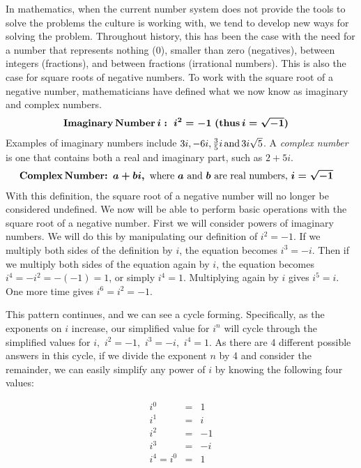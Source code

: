 In mathematics, when the current number system does not provide the tools to
solve the problems the culture is working with, we tend to develop new ways
for solving the problem. Throughout history, this has been the case with the need for a number that represents nothing (0), smaller
than zero (negatives), between integers (fractions), and between fractions
(irrational numbers). This is also the case for square roots of negative
numbers. To work with the square root of a negative number, mathematicians have
defined what we now know as imaginary and complex numbers.
\begin{eqnarray*}
  \boldsymbol{\operatorname{Imaginary} \operatorname{Number} i:~ i^2
  = - 1~ (\operatorname{thus} i = \sqrt{- 1})} &  & 
\end{eqnarray*}
Examples of imaginary numbers include $3 i, - 6 i, \frac{3}{5} i \operatorname{and} 3
i \sqrt{5}$. A \textit{complex number} is one that contains both a real
and imaginary part, such as $2 + 5 i$.
\begin{eqnarray*}
  \boldsymbol{\operatorname{Complex} \operatorname{Number:}~ a+bi, \text{~where~} a \text{~and~} b \text{~are~real~numbers,~}  i = \sqrt{- 1}} &  & 
\end{eqnarray*}
With this definition, the square root of a negative number will no longer
be considered undefined. We now will be able to perform basic operations with the square root of
a negative number. First we will consider powers of imaginary numbers. We will do
this by manipulating our definition of $i^2 = - 1$. If we multiply both sides
of the definition by $i$, the equation becomes $i^3 = - i$. Then if we
multiply both sides of the equation again by $i$, the equation becomes $i^4 =
- i^2 = - (- 1) = 1$, or simply $i^4 = 1$. Multiplying again by $i$ gives $i^5
= i$. One more time gives $i^6 = i^2 = - 1$.\pp

This pattern continues, and we can see a cycle forming.  Specifically, as the exponents on $i$ increase, our simplified value for $i^n$ will cycle through the simplified values for $i,$ $i^2=- 1,$ $i^3= - i,$ $i^4=1$. As there are 4 different possible answers in this
cycle, if we divide the exponent $n$ by 4 and consider the remainder, we can
easily simplify any power of $i$ by knowing the following four values:

\begin{center}
  {}
\end{center}
\[ \begin{array}{rcc}
     i^0 &=& 1\\
     i^1 &=& i\\
     i^2 &=& - 1\\
     i^3 &=& - i\\
		 i^4=i^0&=&1
   \end{array} \]



